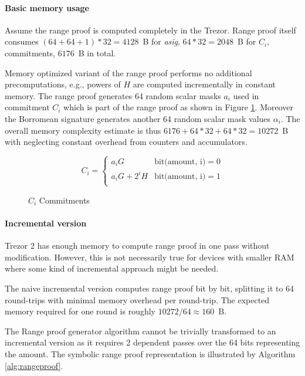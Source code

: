 \documentclass[]{article}
\begin{document}
\paragraph{Basic memory usage}
Assume the range proof is computed completely in the Trezor. Range proof itself consumes $(64 + 64 + 1) * 32 = 4128$~B for \emph{asig}, $64*32 = 2048$~B for $C_i$, commitments, $6176$~B in total.

Memory optimized variant of the range proof performs no additional precomputations, e.g., powers of $H$ are computed incrementally in constant memory. The range proof generates 64 random scalar masks $a_i$ used in commitment $C_i$ which is part of the range proof as shown in Figure \ref{eq:ci}. Moreover the Borromean signature generates another 64 random scalar mask values $\alpha_i$. The overall memory complexity estimate is thus $6176 + 64*32 + 64*32 = 10272$~B with neglecting constant overhead from counters and accumulators.  

\begin{figure}[H]
\begin{equation}
C_i = 
\begin{cases} 
a_iG & \text{bit(amount, i)} = 0 \\
a_iG + 2^iH & \text{bit(amount, i)} = 1 \\
\end{cases}
\end{equation}
\caption{$C_i$ Commitments} \label{eq:ci}
\end{figure}

\paragraph{Incremental version}
Trezor 2 has enough memory to compute range proof in one pass without modification. However, this is not necessarily true for devices with smaller RAM where some kind of incremental approach might be needed.

The naive incremental version computes range proof bit by bit, splitting it to 64 round-trips with minimal memory overhead per round-trip. The expected memory required for one round is roughly $10272 / 64 \approx 160$~B.

The Range proof generator algorithm cannot be trivially transformed to an incremental version as it requires 2 dependent passes over the 64 bits representing the amount. The symbolic range proof representation is illustrated by Algorithm \ref{alg:rangeproof}.
\end{document}
